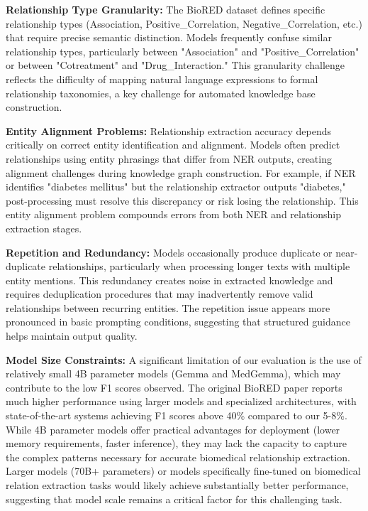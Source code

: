 \textbf{Relationship Type Granularity:} The BioRED dataset defines specific relationship types (Association, Positive\_Correlation, Negative\_Correlation, etc.) that require precise semantic distinction. Models frequently confuse similar relationship types, particularly between "Association" and "Positive\_Correlation" or between "Cotreatment" and "Drug\_Interaction." This granularity challenge reflects the difficulty of mapping natural language expressions to formal relationship taxonomies, a key challenge for automated knowledge base construction.

\textbf{Entity Alignment Problems:} Relationship extraction accuracy depends critically on correct entity identification and alignment. Models often predict relationships using entity phrasings that differ from NER outputs, creating alignment challenges during knowledge graph construction. For example, if NER identifies "diabetes mellitus" but the relationship extractor outputs "diabetes," post-processing must resolve this discrepancy or risk losing the relationship. This entity alignment problem compounds errors from both NER and relationship extraction stages.

\textbf{Repetition and Redundancy:} Models occasionally produce duplicate or near-duplicate relationships, particularly when processing longer texts with multiple entity mentions. This redundancy creates noise in extracted knowledge and requires deduplication procedures that may inadvertently remove valid relationships between recurring entities. The repetition issue appears more pronounced in basic prompting conditions, suggesting that structured guidance helps maintain output quality.

\textbf{Model Size Constraints:} A significant limitation of our evaluation is the use of relatively small 4B parameter models (Gemma and MedGemma), which may contribute to the low F1 scores observed. The original BioRED paper reports much higher performance using larger models and specialized architectures, with state-of-the-art systems achieving F1 scores above 40\% compared to our 5-8\%. While 4B parameter models offer practical advantages for deployment (lower memory requirements, faster inference), they may lack the capacity to capture the complex patterns necessary for accurate biomedical relationship extraction. Larger models (70B+ parameters) or models specifically fine-tuned on biomedical relation extraction tasks would likely achieve substantially better performance, suggesting that model scale remains a critical factor for this challenging task.

